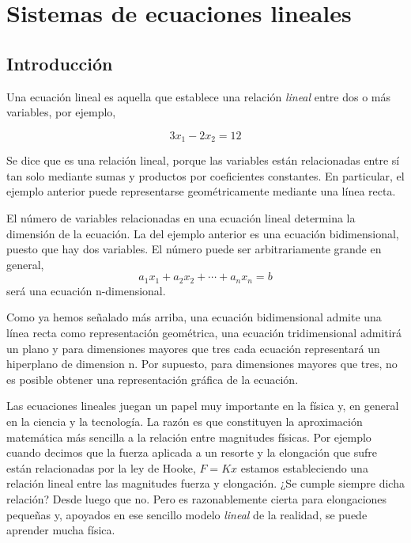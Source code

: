 \chapter{Sistemas de ecuaciones lineales}\label{sistemas}

\section{Introducción}

Una ecuación lineal es aquella que establece una relación \emph{lineal} entre dos o más variables, por ejemplo,

\begin{equation*}
3x_1-2x_2=12
\end{equation*}

Se dice que es una relación lineal, porque las variables están relacionadas entre sí tan solo mediante sumas y productos por coeficientes constantes. En particular, el ejemplo anterior puede representarse geométricamente mediante una línea recta.

El número de variables relacionadas en una ecuación lineal determina la dimensión de la ecuación. La del ejemplo anterior es una ecuación bidimensional, puesto que hay dos variables. El número puede ser arbitrariamente grande en general,
\begin{equation*}
a_1x_1+a_2x_2+\cdots +a_nx_n=b
\end{equation*} 
será una ecuación n-dimensional.

Como ya hemos señalado más arriba, una ecuación bidimensional admite una línea recta como representación geométrica, una ecuación tridimensional admitirá un plano y para dimensiones mayores que tres cada ecuación representará un hiperplano de dimension n. Por supuesto, para dimensiones mayores que tres, no es posible obtener una representación gráfica de la ecuación.

Las ecuaciones lineales juegan un papel muy importante en la física y, en general en la ciencia y la tecnología. La razón es que constituyen la aproximación matemática más sencilla a la relación entre magnitudes físicas. Por ejemplo cuando decimos que la fuerza aplicada a un resorte y la elongación  que sufre están relacionadas por la ley de Hooke, $F=Kx$ estamos estableciendo una relación lineal entre las magnitudes fuerza y elongación. ¿Se cumple siempre dicha relación? Desde luego que no. Pero es razonablemente cierta para elongaciones pequeñas y, apoyados en ese sencillo modelo \emph{lineal} de la realidad, se puede aprender mucha física.

